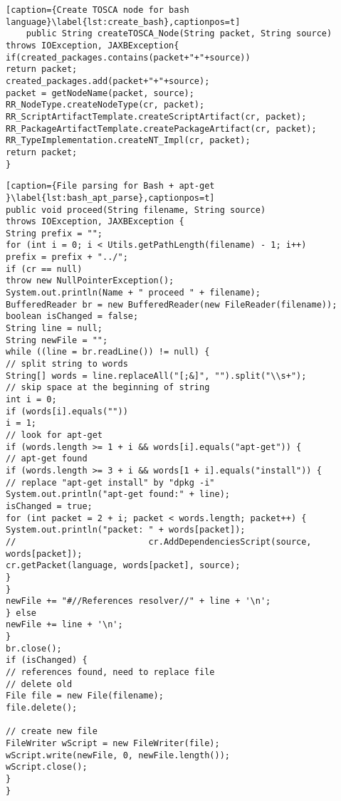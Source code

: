 \begin{lstlisting}[caption={Create TOSCA node for bash language}\label{lst:create_bash},captionpos=t] 
	public String createTOSCA_Node(String packet, String source) throws IOException, JAXBException{
if(created_packages.contains(packet+"+"+source))
return packet;
created_packages.add(packet+"+"+source);
packet = getNodeName(packet, source);
RR_NodeType.createNodeType(cr, packet);
RR_ScriptArtifactTemplate.createScriptArtifact(cr, packet);
RR_PackageArtifactTemplate.createPackageArtifact(cr, packet);
RR_TypeImplementation.createNT_Impl(cr, packet);
return packet;
}
\end{lstlisting}
\begin{lstlisting}[caption={File parsing for Bash + apt-get }\label{lst:bash_apt_parse},captionpos=t] 
public void proceed(String filename, String source)
throws IOException, JAXBException {
String prefix = "";
for (int i = 0; i < Utils.getPathLength(filename) - 1; i++)
prefix = prefix + "../";
if (cr == null)
throw new NullPointerException();
System.out.println(Name + " proceed " + filename);
BufferedReader br = new BufferedReader(new FileReader(filename));
boolean isChanged = false;
String line = null;
String newFile = "";
while ((line = br.readLine()) != null) {
// split string to words
String[] words = line.replaceAll("[;&]", "").split("\\s+");
// skip space at the beginning of string
int i = 0;
if (words[i].equals(""))
i = 1;
// look for apt-get
if (words.length >= 1 + i && words[i].equals("apt-get")) {
// apt-get found
if (words.length >= 3 + i && words[1 + i].equals("install")) {
// replace "apt-get install" by "dpkg -i"
System.out.println("apt-get found:" + line);
isChanged = true;
for (int packet = 2 + i; packet < words.length; packet++) {
System.out.println("packet: " + words[packet]);
//							cr.AddDependenciesScript(source, words[packet]);
cr.getPacket(language, words[packet], source);
}
}
newFile += "#//References resolver//" + line + '\n';
} else
newFile += line + '\n';
}
br.close();
if (isChanged) {
// references found, need to replace file
// delete old
File file = new File(filename);
file.delete();

// create new file
FileWriter wScript = new FileWriter(file);
wScript.write(newFile, 0, newFile.length());
wScript.close();
}
}
\end{lstlisting}
